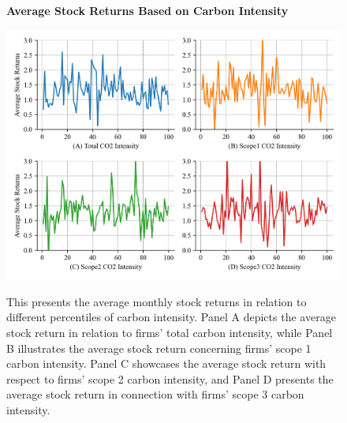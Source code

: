 \documentclass[12pt]{article}
\begin{document}
\begin{figure}[!ht]
\centering
\caption{\textbf{Average Stock Returns Based on Carbon Intensity}}
\includegraphics{graphics/int_percentile.png}
\label{fig: intensity_percentile}
\caption*{\footnotesize{This presents the average monthly stock returns in relation to different percentiles of carbon intensity. Panel A depicts the average stock return in relation to firms' total carbon intensity, while Panel B illustrates the average stock return concerning firms' scope 1 carbon intensity. Panel C showcases the average stock return with respect to firms' scope 2 carbon intensity, and Panel D presents the average stock return in connection with firms' scope 3 carbon intensity.}}
\end{figure}
\end{document}
